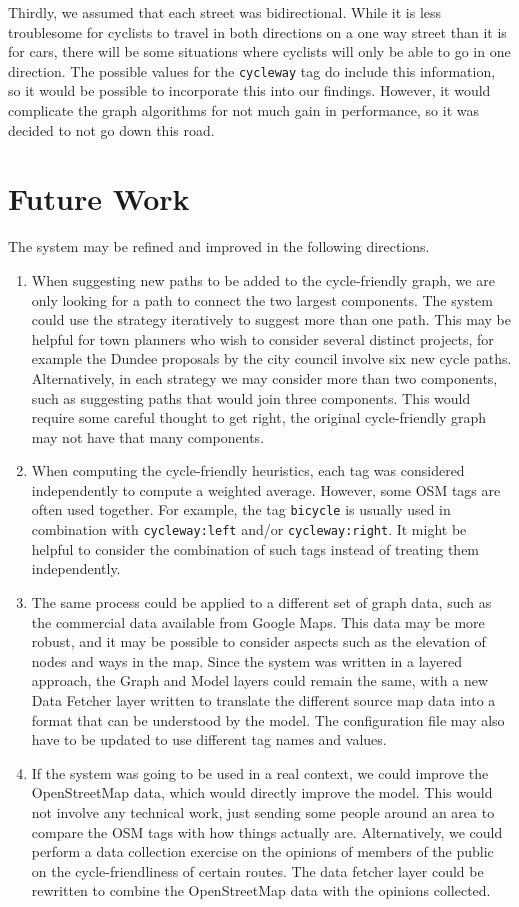 \documentclass[12pt,a4paper]{report}
\begin{document}
Thirdly, we assumed that each street was bidirectional. While it is less troublesome for cyclists to travel in both directions on a one way street than it is for cars, there will be some situations where cyclists will only be able to go in one direction. The possible values for the \texttt{cycleway} tag do include this information, so it would be possible to incorporate this into our findings. However, it would complicate the graph algorithms for not much gain in performance, so it was decided to not go down this road.

\section{Future Work}
The system may be refined and improved in the following directions.
\begin{enumerate}
    \item When suggesting new paths to be added to the cycle-friendly graph, we are only looking for a path to connect the two largest components. The system could use the strategy iteratively to suggest more than one path. This may be helpful for town planners who wish to consider several distinct projects, for example the Dundee proposals by the city council involve six new cycle paths. Alternatively, in each strategy we may consider more than two components, such as suggesting paths that would join three components. This would require some careful thought to get right, the original cycle-friendly graph may not have that many components.
    \item When computing the cycle-friendly heuristics, each tag was considered independently to compute a weighted average. However, some OSM tags are often used together. For example, the tag \texttt{bicycle} is usually used in combination with \texttt{cycleway:left} and/or \texttt{cycleway:right}. It might be helpful to consider the combination of such tags instead of treating them independently.
    \item The same process could be applied to a different set of graph data, such as the commercial data available from Google Maps. This data may be more robust, and it may be possible to consider aspects such as the elevation of nodes and ways in the map. Since the system was written in a layered approach, the Graph and Model layers could remain the same, with a new Data Fetcher layer written to translate the different source map data into a format that can be understood by the model. The configuration file may also have to be updated to use different tag names and values.
    \item If the system was going to be used in a real context, we could improve the OpenStreetMap data, which would directly improve the model. This would not involve any technical work, just sending some people around an area to compare the OSM tags with how things actually are. Alternatively, we could perform a data collection exercise on the opinions of members of the public on the cycle-friendliness of certain routes. The data fetcher layer could be rewritten to combine the OpenStreetMap data with the opinions collected.
\end{enumerate}
\end{document}
